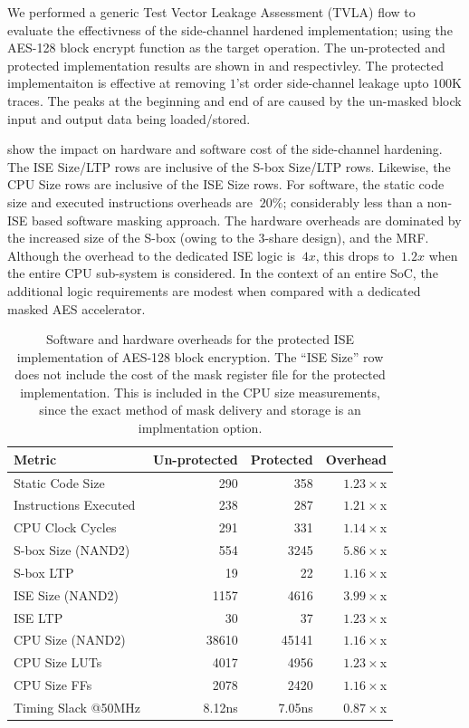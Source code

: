 We performed a generic Test Vector Leakage Assessment (TVLA) \cite{TVLA}
flow to evaluate
the effectivness of the side-channel hardened implementation;
using the AES-128 block encrypt function as the target operation.
The un-protected and protected implementation results are shown in
 and
 respectivley.
The protected implementaiton is effective at removing $1$'st
order side-channel leakage upto $100$K traces.
The peaks at the beginning and end of 
are caused by the un-masked block input and output data being loaded/stored.

 show the impact on hardware and software cost
of the side-channel hardening.
The ISE Size/LTP rows are inclusive of the S-box Size/LTP rows.
Likewise, the CPU Size rows are inclusive of the ISE Size rows.
For software, the static code size and executed instructions overheads are
$~20\%$; considerably less than a non-ISE based software masking approach.
The hardware overheads are dominated by the increased size of the
S-box (owing to the 3-share design), and the MRF.
Although the overhead to the dedicated
ISE logic is $~4x$, this drops to $~1.2x$ when the entire
CPU sub-system is considered.
In the context of an entire SoC, the additional logic requirements
are modest when compared with a dedicated masked AES accelerator.

\begin{table}[]
\centering
\begin{tabular}{lrrr}
Metric  & Un-protected & Protected  & Overhead \\
\hline
Static Code Size      & 290         & 358    & $1.23\times$x        \\
Instructions Executed & 238         & 287    & $1.21\times$x        \\
CPU Clock Cycles      & 291         & 331    & $1.14\times$x        \\
S-box Size (NAND2)    & 554         & 3245   & $5.86\times$x        \\
S-box LTP             & 19          & 22     & $1.16\times$x        \\
ISE Size (NAND2)      & 1157        & 4616   & $3.99\times$x        \\
ISE LTP               & 30          & 37     & $1.23\times$x        \\
CPU Size (NAND2)      & 38610       & 45141  & $1.16\times$x        \\
CPU Size  LUTs        & 4017        & 4956   & $1.23\times$x        \\
CPU Size  FFs         & 2078        & 2420   & $1.16\times$x        \\
Timing Slack @50MHz   & 8.12ns      & 7.05ns & $0.87\times$x
\end{tabular}
\caption{
Software and hardware overheads for the protected ISE implementation
of AES-128 block encryption.
The ``ISE Size'' row does not include the cost of the mask register file
for the protected implementation.
This is included in the CPU size measurements, since the exact method
of mask delivery and storage is an implmentation option.
}
\label{tab:sca:sw-hw}
\end{table}

